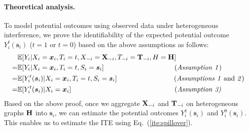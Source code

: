 \documentclass[runningheads]{llncs}
\begin{document}
\paragraph{Theoretical analysis.} To model potential outcomes using observed data under heterogeneous interference, we prove the identifiability of the expected potential outcome $Y_i^{t}(\boldsymbol{s}_i)$ ($t=1$ or $t=0$) based on the above assumptions as follows:
\begin{equation*}
\begin{aligned}
 &\mathbb{E}[Y_i\vert X_i=\boldsymbol{x}_i,T_i=t,X_{-i} = \bold{X}_{-i},T_{-i} = \bold{T}_{-i},H=\bold{H}]\\
 = &\mathbb{E}[Y_i\vert X_i=\boldsymbol{x}_i,T_i=t,S_i=\boldsymbol{s}_i]\quad \quad \quad \quad \quad \quad \quad \quad \quad\quad \:\text{(\emph{Assumption 1})}\\
  = &\mathbb{E}[Y^t_i(\boldsymbol{s}_i)\vert X_i=\boldsymbol{x}_i,T_i=t,S_i=\boldsymbol{s}_i] \quad \quad\; \quad\quad \quad\quad \quad\quad\text{(\emph{Assumptions 1} and \emph{2})}\\
 = &\mathbb{E}[Y^t_i(\boldsymbol{s}_i)\vert X_i=\boldsymbol{x}_i] \quad \quad\quad\quad\quad \quad \quad \quad \quad\quad  \quad \quad  \quad \quad \quad \text{(\emph{Assumption 3)}} 
\end{aligned}
\end{equation*}
Based on the above proof, once we aggregate $\bold{X}_{-i}$ and $\bold{T}_{-i}$ on heterogeneous graphs $\bold{H}$ into $\boldsymbol{s}_i$,
we can estimate the potential outcomes $Y_i^{1}(\boldsymbol{s}_i)$ and $Y_i^{0}(\boldsymbol{s}_i)$. This enables us to estimate the ITE using Eq.~(\ref{ite:spillover}).


\end{document}
